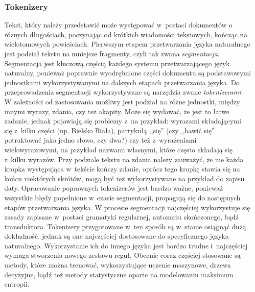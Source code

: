 \documentclass[a4paper, twoside, openright, 12pt]{report}
\begin{document}
            \subsubsection{Tokenizery}
                Tekst, który należy przedstawić może występować w~postaci dokumentów o różnych długościach, poczynając od
                krótkich wiadomości tekstowych, kończąc na wielotomowych powieściach. Pierwszym etapem przetwarzania języka
                naturalnego jest podział tekstu na mniejsze fragmenty, czyli tak zwana \emph{segmentacja}. Segmentacja jest
                kluczową częścią każdego systemu przetwarzającego język naturalny, ponieważ poprawnie wyodrębnione części
                dokumentu są podstawowymi jednostkami wykorzystywanymi na dalszych etapach przetwarzania języka.
                Do przeprowadzenia segmentacji wykorzystywane są narzędzia zwane
                \emph{tokenizerami}.
                W zależności od zastosowania możliwy jest podział na różne jednostki, między innymi wyrazy, zdania, czy też akapity.
                Może się wydawać, że jest to łatwe zadanie, jednak pojawiają się problemy z~na przykład: wyrazami składającymi
                się z~kilku części (np. Bielsko Biała), partykułą ,,się'' (czy ,,bawić się'' potraktować jako jedno słowo, czy dwa?)
                czy też z~wyrażeniami wielowyrazowymi, na przykład nazwami własnymi, które często składają się z~kilku wyrazów.
                Przy podziale tekstu na zdania należy zauważyć, że nie każda kropka występująca w~tekście kończy zdanie, oprócz
                tego kropkę stawia się na końcu niektórych skrótów, mogą być też wykorzystywane na przykład do zapisu daty.
                Opracowanie poprawnych tokenizerów jest bardzo ważne, ponieważ wszystkie błędy popełnione w~czasie segmentacji,
                propagują się do następnych etapów przetwarzania języka. W procesie segmentacji najczęściej wykorzystuje się
                zasady zapisane w~postaci gramatyki regularnej, automatu skończonego, bądź transduktora. Tokenizery przygotowane
                w~ten sposób są w~stanie osiągnąć dużą dokładność, jednak są one najczęściej dostosowane do specyficznego języka
                naturalnego. Wykorzystanie ich do innego języka jest bardzo trudne i~najczęściej wymaga stworzenia nowego
                zestawu reguł. Obecnie coraz częściej stosowane są metody, które można trenować, wykorzystujące uczenie maszynowe,
                drzewa decyzyjne, bądź też metody statystyczne oparte na modelowaniu maksimum entropii\cite{HANDBOOKNLP}.
\end{document}
